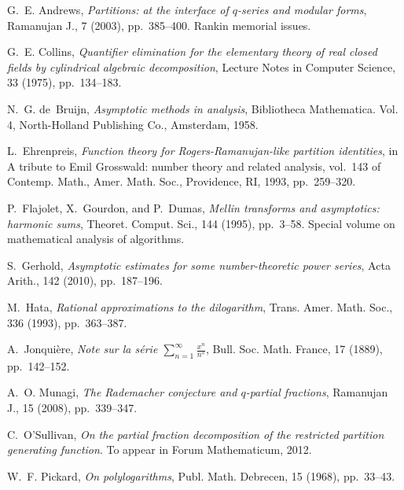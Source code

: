 \documentclass[a4paper]{amsart}
\begin{document}

\begin{thebibliography}{10}

  {\sc G.~E. Andrews}, {\em Partitions: at the interface of {$q$}-series and
    modular forms}, Ramanujan J., 7 (2003), pp.~385--400.
  \newblock Rankin memorial issues.
  
  {\sc G.~E. Collins}, {\em Quantifier elimination for the elementary theory of
    real closed fields by cylindrical algebraic decomposition}, Lecture Notes in
    Computer Science, 33 (1975), pp.~134--183.
  
  {\sc N.~G. de~Bruijn}, {\em Asymptotic methods in analysis}, Bibliotheca
    Mathematica. Vol. 4, North-Holland Publishing Co., Amsterdam, 1958.
  
  {\sc L.~Ehrenpreis}, {\em Function theory for {R}ogers-{R}amanujan-like
    partition identities}, in A tribute to {E}mil {G}rosswald: number theory and
    related analysis, vol.~143 of Contemp. Math., Amer. Math. Soc., Providence,
    RI, 1993, pp.~259--320.
  
  {\sc P.~Flajolet, X.~Gourdon, and P.~Dumas}, {\em Mellin transforms and
    asymptotics: harmonic sums}, Theoret. Comput. Sci., 144 (1995), pp.~3--58.
  \newblock Special volume on mathematical analysis of algorithms.
  
  {\sc S.~Gerhold}, {\em Asymptotic estimates for some number-theoretic power
    series}, Acta Arith., 142 (2010), pp.~187--196.
  
  {\sc M.~Hata}, {\em Rational approximations to the dilogarithm}, Trans. Amer.
    Math. Soc., 336 (1993), pp.~363--387.
  
  {\sc A.~Jonqui{\`e}re}, {\em Note sur la s\'erie {$\sum_{n=1}^{\infty}
    \frac{x^n}{n^s}$}}, Bull. Soc. Math. France, 17 (1889), pp.~142--152.
  
  {\sc A.~O. Munagi}, {\em The {R}ademacher conjecture and {$q$}-partial
    fractions}, Ramanujan J., 15 (2008), pp.~339--347.
  
  {\sc C.~O'Sullivan}, {\em On the partial fraction decomposition of the
    restricted partition generating function}.
  \newblock To appear in Forum Mathematicum, 2012.
  
  {\sc W.~F. Pickard}, {\em On polylogarithms}, Publ. Math. Debrecen, 15 (1968),
    pp.~33--43.
  

\end{thebibliography}
\end{document}
